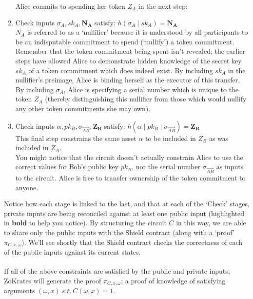\documentclass{article}
\begin{document}
\begin{enumerate}
  Alice commits to spending her token $Z_A$ in the next step:
  \item Check inputs $\sigma_{A}, sk_A, \bm{N_A}$ satisfy:
    $h(\sigma_{A}\;|\;sk_A) = \bm{N_{A}}$\\
    $N_A$ is referred to as a `nullifier' because it is understood by all participants to be an indisputable commitment to spend (`nullify') a token commitment. Remember that the token commitment being spent isn't revealed; the earlier steps have allowed Alice to demonstrate hidden knowledge of the secret key $sk_A$ of a token commitment which does indeed exist. By including $sk_A$ in the nullifier's preimage, Alice is binding herself as the executor of this transfer. By including $\sigma_A$, Alice is specifying a serial number which is unique to the token $Z_A$ (thereby distinguishing this nullifier from those which would nullify any other token commitments she may own).\\
  \item Check inputs $\alpha, pk_B, \sigma_{\vec{AB}}, \bm{Z_B}$ satisfy:
    $h(\alpha\;|\;pk_B\;|\;\sigma_{\vec{AB}}) = \bm{Z_B}$\\
    This final step constrains the same asset $\alpha$ to be included in $Z_B$ as was included in $Z_A$.\\
    You might notice that the circuit doesn't actually constrain Alice to use the correct values for Bob's public key $pk_B$, nor the serial number $\sigma_{\vec{AB}}$ as inputs to the circuit. Alice is free to transfer ownership of the token commitment to anyone.
\end{enumerate}
Notice how each stage is linked to the last, and that at each of the `Check' stages, private inputs are being reconciled against at least one public input (highlighted in \textbf{bold} to help you notice). By structuring the circuit $C$ in this way, we are able to share only the public inputs with the Shield contract (along with a `proof' $\pi_{C,x,\omega}$). We'll see shortly that the Shield contract checks the correctness of each of the public inputs against its current states.\\
\\

\noindent
If all of the above constraints are satisfied by the public and private inputs, ZoKrates will generate the proof $\pi_{C,x,\omega}$; a proof of knowledge of satisfying arguments $(\omega, x) \ s.t. \ C(\omega, x) = 1$.
\end{document}

